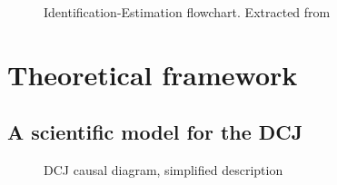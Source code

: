\documentclass[
  authoryear,
  preprint,
  1p]{elsarticle}
\begin{document}
\begin{figure}


\caption{\label{fig-IEflow}Identification-Estimation flowchart.
Extracted from \citet[32]{Neal_2020}}

\end{figure}%

\section{Theoretical framework}\label{sec-theory}

\subsection{A scientific model for the DCJ}\label{sec-theory-scientific}

\begin{figure}


\caption{\label{fig-SciModel_simp1}DCJ causal diagram, simplified
description}

\end{figure}%
\end{document}
